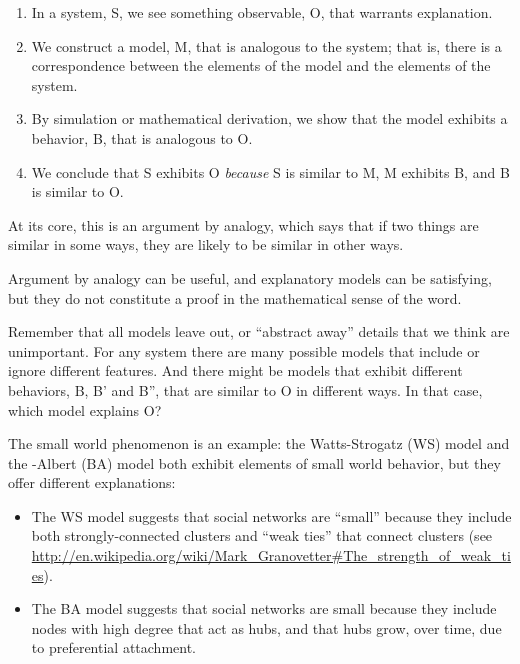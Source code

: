 \documentclass[12pt]{book}
\theoremstyle{exercise}
\begin{document}
\begin{enumerate}

\item In a system, S, we see something observable, O, that warrants
  explanation.

\item We construct a model, M, that is analogous to the system; that
  is, there is a correspondence between the elements of the model and
  the elements of the system.

\item By simulation or mathematical derivation, we show that the model
  exhibits a behavior, B, that is analogous to O.

\item We conclude that S exhibits O {\em because} S is similar to M, M
  exhibits B, and B is similar to O.

\end{enumerate}

At its core, this is an argument by analogy, which says that if two
things are similar in some ways, they are likely to be similar in
other ways.

Argument by analogy can be useful, and explanatory models can be
satisfying, but they do not constitute a proof in the mathematical
sense of the word.

Remember that all models leave out, or ``abstract away''
details that we think are unimportant.  For any system there
are many possible models that include or ignore different features.
And there might be models that exhibit different behaviors,
B, B' and B'', that are similar to O in different ways.
In that case, which model explains O?

The small world phenomenon is an example: the Watts-Strogatz (WS)
model and the \Barabasi-Albert (BA) model both exhibit elements of
small world behavior, but they offer different explanations:

\begin{itemize}

\item The WS model suggests that social networks are ``small'' because
  they include both strongly-connected clusters and ``weak ties'' that
  connect clusters (see \url{http://en.wikipedia.org/wiki/Mark_Granovetter#The_strength_of_weak_ties}).

\item The BA model suggests that social networks are small because
  they include nodes with high degree that act as hubs, and that
  hubs grow, over time, due to preferential attachment.

\end{itemize}
\end{document}
